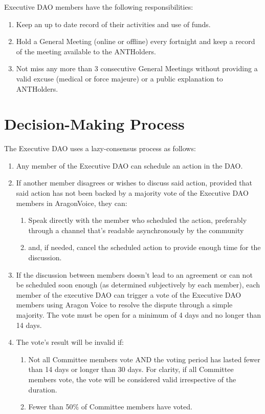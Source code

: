  Executive \ac{DAO} members have the following responsibilities:
\begin{enumerate}
	\item Keep an up to date record of their activities and use of funds.
	\item Hold a General Meeting (online or offline) every fortnight and keep a record of the meeting available to the \glspl{ANTHolder}.
	\item Not miss any more than 3 consecutive General Meetings without providing a valid excuse (medical or force majeure) or a public explanation to \glspl{ANTHolder}.
\end{enumerate}


\section{Decision-Making Process} 

The Executive \ac{DAO} uses a lazy-consensus process as follows:
\begin{enumerate}
	
	\item Any member of the Executive \ac{DAO} can schedule an action in the \ac{DAO}.
	\item If another member disagrees or wishes to discuss said action, provided that said action has not been backed by a majority vote of the Executive \ac{DAO} members in \gls{AragonVoice}, they can:
	\begin{enumerate}
		\item Speak directly with the member who scheduled the action, preferably through a channel that’s readable asynchronously by the community
		\item and, if needed, cancel the scheduled action to provide enough time for the discussion.
	\end{enumerate}
	
	\item If the discussion between members doesn’t lead to an agreement or can not be scheduled soon enough (as determined subjectively by each member), each member of the executive \ac{DAO} can trigger a vote of the Executive \ac{DAO} members using Aragon Voice to resolve the dispute through a simple majority.
	The vote must be open for a minimum of 4 days and no longer than 14 days.
	\item The vote’s result will be invalid if:
	\begin{enumerate}
		\item Not all Committee members vote AND the voting period has lasted fewer than 14 days or longer than 30 days.
		For clarity, if all Committee members vote, the vote will be considered valid irrespective of the duration.
		\item Fewer than 50\% of Committee members have voted.
	\end{enumerate}

\end{enumerate}


